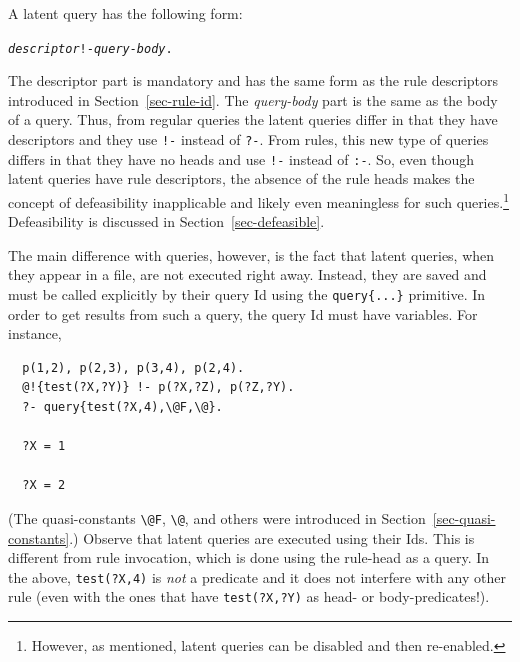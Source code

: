 \documentclass[11pt]{article}
\newcommand{\bs}{\textbackslash}
\begin{document}
A latent query has the following form:
\begin{alltt}
   \textnormal{\em descriptor}  !- \textnormal{\emph{query-body}}.
\end{alltt}
The descriptor part is mandatory and has the same form as the rule
descriptors introduced in Section~\ref{sec-rule-id}.  The \emph{query-body}
part is the same as the body of a query. Thus, from regular queries the
latent queries differ in that they have descriptors and they use
\texttt{!-} instead of \texttt{?-}. From rules, this new type of queries
differs in that they have no heads and use \texttt{!-} instead of
\texttt{:-}.  So, even though latent queries have rule descriptors, the
absence of the rule heads makes the concept of defeasibility inapplicable
and likely even meaningless for such queries.\footnote{ However, as
  mentioned, latent queries can be disabled and then re-enabled.}
Defeasibility is discussed in Section~\ref{sec-defeasible}.

The main difference with queries, however, is the fact that latent queries,
when they appear in a file,
are not executed right away. Instead, they are saved and must be called
explicitly by their query Id using the \texttt{query\{...\}} primitive. In
order to get results from such a query,
the query Id must have variables. For instance,
\begin{verbatim}
  p(1,2), p(2,3), p(3,4), p(2,4).
  @!{test(?X,?Y)} !- p(?X,?Z), p(?Z,?Y).
  ?- query{test(?X,4),\@F,\@}.

  ?X = 1

  ?X = 2
\end{verbatim}
(The quasi-constants \texttt{\bs{}@F}, \texttt{\bs{}@}, and others
were introduced in Section~\ref{sec-quasi-constants}.)
Observe that latent queries are executed using their Ids. This is different
from rule invocation, which is done using the rule-head as a query. In the
above, \texttt{test(?X,4)} is \emph{not} a predicate and it does not
interfere with any other rule (even with the ones that have \texttt{test(?X,?Y)}
as head- or body-predicates!).
\end{document}
